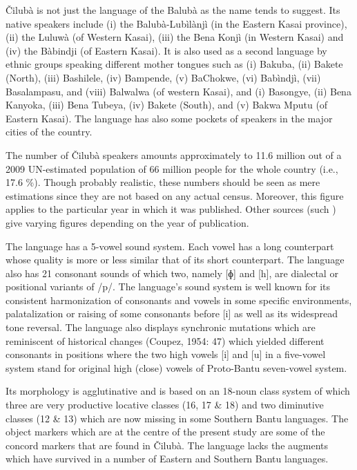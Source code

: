 \documentclass[output=paper]{langscibook}
\begin{document}
Čilubà is not just the language of the Balubà as the name tends to suggest. Its native speakers include (i) the Balubà-Lubìlànjì (in the Eastern Kasai province), (ii) the Luluwà (of Western Kasai), (iii) the Bena Konjì (in Western Kasai) and (iv) the Bàbindji (of Eastern Kasai). It is also used as a second language by ethnic groups speaking different mother tongues such as (i) Bakuba, (ii) Bakete (North), (iii) Bashilele, (iv) Bampende, (v) BaChokwe, (vi) Babìndjì, (vii) Basalampasu, and (viii) Balwalwa (of western Kasai), and (i) Basongye, (ii) Bena Kanyoka, (iii) Bena Tubeya, (iv) Bakete (South), and (v) Bakwa Mputu (of Eastern Kasai). The language has also some pockets of speakers in the major cities of the country.

The number of Čilubà speakers amounts approximately to 11.6 million out of a 2009 UN-estimated population of 66 million people for the whole country (i.e., 17.6 \%). Though probably realistic, these numbers should be seen as mere estimations since they are not based on any actual census. Moreover, this figure applies to the particular year in which it was published. Other sources (such \citet{SimonsFennig2017}) give varying figures depending on the year of publication.

The language has a 5-vowel sound system. Each vowel has a long counterpart whose quality is more or less similar that of its short counterpart. The language also has 21 consonant sounds of which two, namely [ɸ] and [h], are dialectal or positional variants of /p/. The language’s sound system is well known for its consistent harmonization of consonants and vowels in some specific environments, palatalization or raising of some consonants before [i] as well as its widespread tone reversal. The language also displays synchronic mutations which are reminiscent of historical changes (Coupez, 1954: 47) which yielded different consonants in positions where the two high vowels [i] and [u] in a five-vowel system stand for original high (close) vowels of Proto-Bantu seven-vowel system.

Its morphology is agglutinative and is based on an 18-noun class system of which three are very productive locative classes (16, 17 \& 18) and two diminutive classes (12 \& 13) which are now missing in some Southern Bantu languages. The object markers which are at the centre of the present study are some of the concord markers that are found in Čilubà. The language lacks the augments which have survived in a number of Eastern and Southern Bantu languages.
\end{document}

